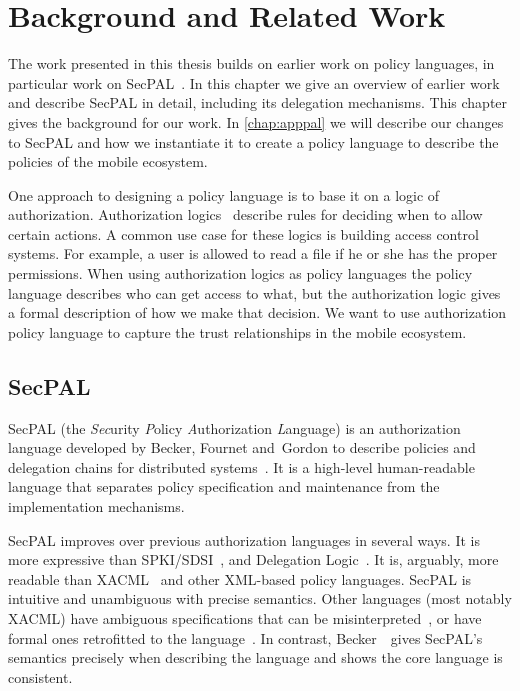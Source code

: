 \documentclass[thesis.tex]{subfiles}
\begin{document}
\chapter{Background and Related Work}
\label{chap:background}

The work presented in this thesis builds on earlier work on policy
languages, in particular work on SecPAL~\cite{becker_secpal:_2006}. In
this chapter we give an overview of earlier work and describe SecPAL
in detail, including its delegation mechanisms. This chapter gives the
background for our work. In \autoref{chap:apppal} we will describe our
changes to SecPAL and how we instantiate it to create a policy
language to describe the policies of the mobile ecosystem.

One approach to designing a policy language is to base it on a logic
of authorization. Authorization logics~\cite{abadi_calculus_1991}
describe rules for deciding when to allow certain actions. A
common use case for these logics is building access control systems. For example, a
user is allowed to read a file if he or she has the proper
permissions. When using authorization logics as policy languages
the policy language describes who can get access to what, but the
authorization logic gives a formal description of how we make that
decision. We want to use authorization policy language to capture the
trust relationships in the mobile ecosystem.

\section{SecPAL}

SecPAL (the \emph{Sec}urity \emph{P}olicy \emph{A}uthorization \emph{L}anguage) is an authorization language developed by Becker, Fournet
and~Gordon to describe policies and delegation chains for distributed
systems~\cite{becker_secpal:_2006}. It is a high-level human-readable
language that separates policy specification and maintenance from the
implementation mechanisms.

SecPAL improves over previous authorization languages in several
ways. It is more expressive than
SPKI/SDSI~\cite{ellison_spki_1999}, and Delegation
Logic~\cite{li_delegation_2003}. It is, arguably, more readable than
XACML~\cite{oasis_extensible_2013} and other XML-based policy
languages.  SecPAL is intuitive and unambiguous with precise
semantics. Other languages (most notably XACML) have ambiguous
specifications that can be misinterpreted~\cite{ramli_logic_2014}, or
have formal ones retrofitted to the
language~\cite{bryans_reasoning_2005,masi_formalisation_2012}.  In
contrast, Becker~\etal~gives SecPAL's semantics precisely when
describing the language and shows the core language is consistent.
\end{document}
